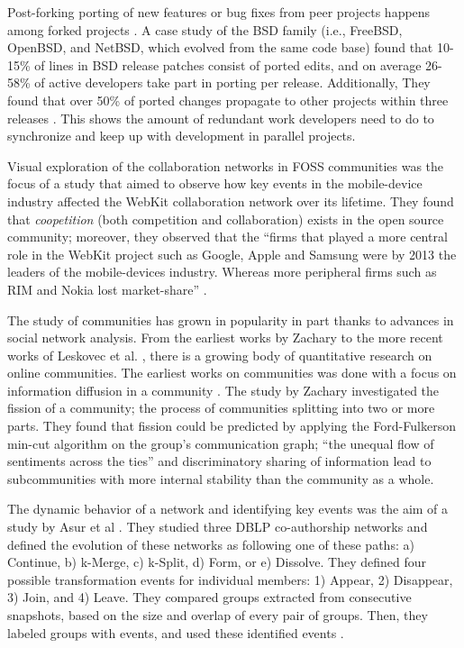 \documentclass[12pt]{report}
\begin{document}
Post-forking porting of new features or bug fixes from peer projects happens among forked projects \cite{Baishakhi}. A case study of the BSD family (i.e., FreeBSD, OpenBSD, and NetBSD, which evolved from the same code base) found that 10-15\% of lines in BSD release patches consist of ported edits, and on average 26-58\% of active developers take part in porting per release. Additionally, They found that over 50\% of ported changes propagate to other projects within three releases \cite{Baishakhi}. This shows the amount of redundant work developers need to do to synchronize and keep up with development in parallel projects. 

Visual exploration of the collaboration networks in FOSS communities was the focus of a study that aimed to observe how key events in the mobile-device industry affected the WebKit collaboration network over its lifetime. \cite{JoseWebKit} They found that \textit{coopetition} (both competition and collaboration) exists in the open source community; moreover, they observed that the ``firms that played a more central role in the WebKit project such as Google, Apple and Samsung were by 2013 the leaders of the mobile-devices industry. Whereas more peripheral firms such as RIM and Nokia lost market-share'' \cite{JoseWebKit}. 

The study of communities has grown in popularity in part thanks to advances in social network analysis.  From the earliest works by Zachary \cite{Zachary} to the more recent works of Leskovec et al. \cite{LeskovecGraphsOverTime}\cite{LeskovecStatisticalPropertiesOfCommunityStructure}, there is a growing body of quantitative research on online communities. The earliest works on communities was done with a focus on information diffusion in a community \cite{Zachary}. The study by Zachary investigated the fission of a community; the process of communities splitting into two or more parts. They found that fission could be predicted by applying the Ford-Fulkerson min-cut algorithm \cite{Ford} on the group's communication graph; ``the unequal flow of sentiments across the ties'' and discriminatory sharing of information lead to subcommunities with more internal stability than the community as a whole.\cite{Zachary}

The dynamic behavior of a network and identifying key events was the aim of a study by Asur et al \cite{Asur}. They studied three DBLP co-authorship networks and defined the evolution of these networks as following one of these paths: a) Continue, b) k-Merge, c) k-Split, d) Form, or e) Dissolve. They defined four possible transformation events for individual members: 1) Appear, 2) Disappear, 3) Join, and 4) Leave. They compared groups extracted from consecutive snapshots, based on the size and overlap of every pair of groups. Then, they labeled groups with events, and used these identified events \cite{Asur}.
\end{document}
